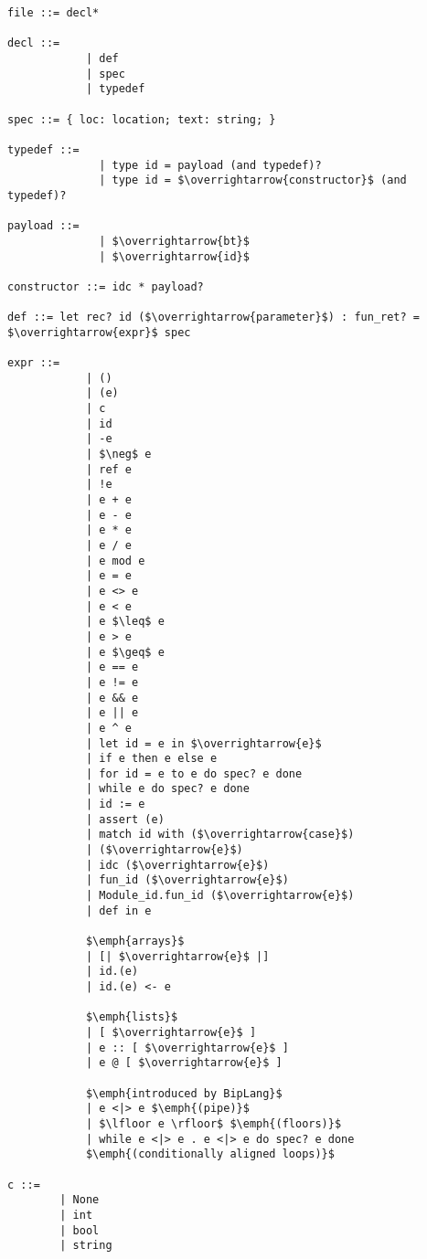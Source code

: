 \begin{lstlisting}[mathescape, basicstyle=\ttfamily, columns=flexible,
                    emph={type, and, let, rec, if, then, else, mod, in, for, while, do, done, to, begin, end, assert, match, with, of, open, include,ref},
                    emphstyle=\ttfamily\bfseries\color{myorange}]
file ::= decl*

decl ::= 
            | def
            | spec
            | typedef

spec ::= { loc: location; text: string; }

typedef ::=
              | type id = payload (and typedef)?
              | type id = $\overrightarrow{constructor}$ (and typedef)?

payload ::= 
              | $\overrightarrow{bt}$
              | $\overrightarrow{id}$

constructor ::= idc * payload?

def ::= let rec? id ($\overrightarrow{parameter}$) : fun_ret? = $\overrightarrow{expr}$ spec

expr ::=
            | ()
            | (e)
            | c
            | id
            | -e
            | $\neg$ e
            | ref e 
            | !e
            | e + e
            | e - e
            | e * e
            | e / e
            | e mod e
            | e = e
            | e <> e
            | e < e
            | e $\leq$ e
            | e > e
            | e $\geq$ e
            | e == e
            | e != e
            | e && e
            | e || e 
            | e ^ e
            | let id = e in $\overrightarrow{e}$
            | if e then e else e
            | for id = e to e do spec? e done 
            | while e do spec? e done 
            | id := e
            | assert (e)
            | match id with ($\overrightarrow{case}$)
            | ($\overrightarrow{e}$)
            | idc ($\overrightarrow{e}$)
            | fun_id ($\overrightarrow{e}$)
            | Module_id.fun_id ($\overrightarrow{e}$)
            | def in e
            
            $\emph{arrays}$
            | [| $\overrightarrow{e}$ |]
            | id.(e)
            | id.(e) <- e

            $\emph{lists}$
            | [ $\overrightarrow{e}$ ]
            | e :: [ $\overrightarrow{e}$ ]
            | e @ [ $\overrightarrow{e}$ ]

            $\emph{introduced by BipLang}$
            | e <|> e $\emph{(pipe)}$
            | $\lfloor e \rfloor$ $\emph{(floors)}$
            | while e <|> e . e <|> e do spec? e done
            $\emph{(conditionally aligned loops)}$

c ::=
        | None
        | int
        | bool
        | string

\end{lstlisting}

